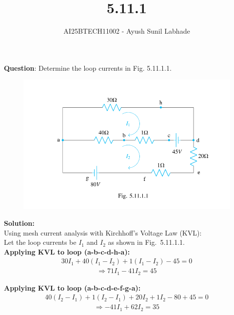 \documentclass[journal]{IEEEtran}
\begin{document}
\title{5.11.1}
\author{AI25BTECH11002 - Ayush Sunil Labhade}
{\let\newpage\relax\maketitle}

\renewcommand{\thefigure}{\theenumi}
\renewcommand{\thetable}{\theenumi}
\setlength{\intextsep}{10pt} 
\renewcommand{\thetable}{\theenumi}

\textbf{Question}: Determine the loop currents in Fig. 5.11.1.1.
\begin{figure}[H]
    \centering
    \includegraphics[width=\columnwidth]{Figs/5.11.1.1.png}
    \label{Circuit}
\end{figure}

\newpage
\textbf{Solution:}\\

Using mesh current analysis with Kirchhoff's Voltage Law (KVL):\\

Let the loop currents be $I_1$ and $I_2$ as shown in Fig.~5.11.1.1.\\

\textbf{Applying KVL to loop (a-b-c-d-h-a):}
\begin{align}
30I_1 + 40(I_1 - I_2) + 1(I_1 - I_2) - 45 = 0
\end{align}
\begin{align}
\Rightarrow 71I_1 - 41I_2 = 45
\end{align}

\textbf{Applying KVL to loop (a-b-c-d-e-f-g-a):}
\begin{align}
40(I_2 - I_1) + 1(I_2 - I_1) + 20I_2 + 1I_2 - 80 + 45 = 0
\end{align}
\begin{align}
\Rightarrow -41I_1 + 62I_2 = 35
\end{align}
\end{document}
